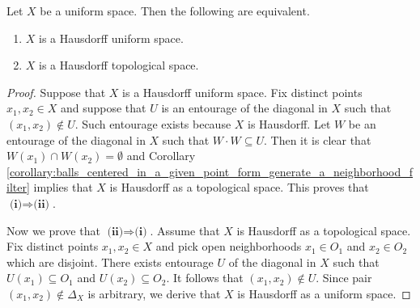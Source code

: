 \documentclass[10pt]{amsart}
\begin{document}
\begin{fact}\label{fact:Hausdorff_uniform_space_is_Hausdorff_as_a_topological_space}
	Let $X$ be a uniform space. Then the following are equivalent.
	\begin{enumerate}[label=\emph{\textbf{(\roman*)}}, leftmargin=3.0em]
		\item $X$ is a Hausdorff uniform space.
		\item $X$ is a Hausdorff topological space.
	\end{enumerate}
\end{fact}
\begin{proof}
	Suppose that $X$ is a Hausdorff uniform space. Fix distinct points $x_1,x_2 \in X$ and suppose that $U$ is an entourage of the diagonal in $X$ such that $(x_1,x_2) \not \in U$. Such entourage exists because $X$ is Hausdorff. Let $W$ be an entourage of the diagonal in $X$ such that $W\cdot W \subseteq U$. Then it is clear that $W(x_1)\cap W(x_2) = \emptyset$ and Corollary \ref{corollary:balls_centered_in_a_given_point_form_generate_a_neighborhood_filter} implies that $X$ is Hausdorff as a topological space. This proves that $\textbf{(i)}\Rightarrow \textbf{(ii)}$.

	Now we prove that $\textbf{(ii)}\Rightarrow \textbf{(i)}$. Assume that $X$ is Hausdorff as a topological space. Fix distinct points $x_1,x_2 \in X$ and pick open neighborhoods $x_1 \in O_1$ and $x_2 \in O_2$ which are disjoint. There exists entourage $U$ of the diagonal in $X$ such that $U(x_1) \subseteq O_1$ and $U(x_2) \subseteq O_2$. It follows that $(x_1,x_2) \not \in U$. Since pair $(x_1,x_2) \not \in \Delta_X$ is arbitrary, we derive that $X$ is Hausdorff as a uniform space.
\end{proof}
\end{document}
